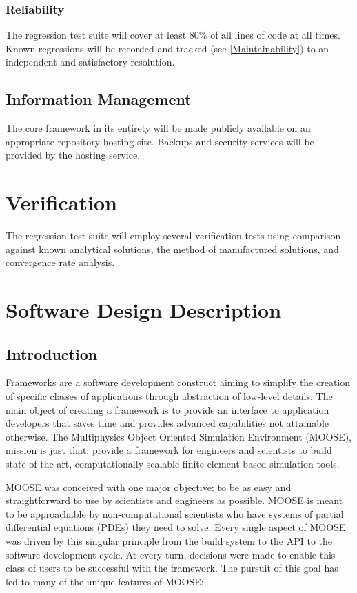 \documentclass{INLreport}
\begin{document}
\subsubsection{Reliability}
The regression test suite will cover at least 80\% of all lines of code at all times. Known regressions will be recorded
and tracked (see \ref{Maintainability}) to an independent and satisfactory resolution.

\subsection{Information Management}
The core framework in its entirety will be made publicly available on an appropriate repository hosting site. Backups and
security services will be provided by the hosting service.

\section{Verification}

The regression test suite will employ several verification tests using comparison against known analytical solutions, the method of
manufactured solutions, and convergence rate analysis.


\section{Software Design Description}

\subsection{Introduction}
Frameworks are a software development construct aiming to simplify the creation of specific classes of applications
through abstraction of low-level details. The main object of creating a framework is to provide an interface to
application developers that saves time and provides advanced capabilities not attainable otherwise. The Multiphysics
Object Oriented Simulation Environment (MOOSE), mission is just that: provide a framework for engineers and scientists
to build state-of-the-art, computationally scalable finite element based simulation tools.

MOOSE was conceived with one major objective: to be as easy and straightforward to use by scientists and engineers as possible.
MOOSE is meant to be approachable by non-computational scientists who have systems of partial differential equations (PDEs)
they need to solve. Every single aspect of MOOSE was driven by this singular principle from the build system to the API to the
software development cycle.  At every turn, decisions were made to enable this class of users to be successful with the framework.
The pursuit of this goal has led to many of the unique features of MOOSE:
\end{document}

